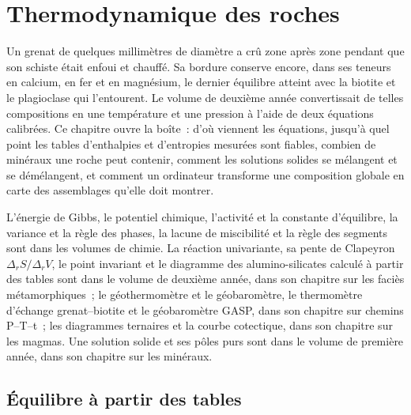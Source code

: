 \chapter{Thermodynamique des roches}\label{ch:b3:petrological-thermodynamics}

Un grenat de quelques millimètres de diamètre a crû zone après zone pendant que son schiste était enfoui
et chauffé. Sa bordure conserve encore, dans ses teneurs en calcium, en fer et en magnésium,
le dernier équilibre atteint avec la biotite et le plagioclase qui l'entourent. Le
volume de deuxième année convertissait de telles compositions en une température et une pression
à l'aide de deux équations calibrées. Ce chapitre ouvre la boîte~: d'où viennent les
équations, jusqu'à quel point les tables d'enthalpies et d'entropies mesurées sont fiables,
combien de minéraux une roche peut contenir, comment les solutions solides se mélangent et
se démélangent, et comment un ordinateur transforme une composition globale en carte des
assemblages qu'elle doit montrer.

\begin{recall}
L'énergie de Gibbs, le potentiel chimique, l'activité et la constante d'équilibre,
la variance et la règle des phases, la lacune de miscibilité et la règle des
segments sont dans les volumes de chimie. La réaction univariante,
sa pente de Clapeyron $\Delta_rS/\Delta_rV$, le point invariant et le
diagramme des alumino-silicates calculé à partir des tables sont dans le volume de deuxième année, dans son
chapitre sur les faciès métamorphiques~; le géothermomètre et le géobaromètre, le
thermomètre d'échange grenat--biotite et le géobaromètre GASP, dans son chapitre sur
chemins P--T--t~; les diagrammes ternaires et la courbe cotectique, dans son chapitre sur les magmas. Une
solution solide et ses pôles purs sont dans le volume de première année, dans son chapitre sur
les minéraux.
\end{recall}

\section{Équilibre à partir des tables}\label{sec:b3:petrological-thermodynamics:tables}

